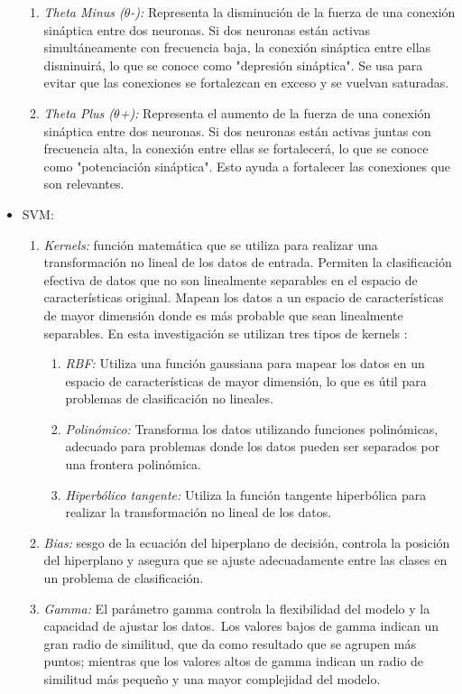 \begin{itemize}
\begin{enumerate}
		\item \textit{Theta Minus ($\theta$-):} Representa la disminución de la fuerza de una conexión sináptica entre dos neuronas. Si dos neuronas están activas simultáneamente con frecuencia baja, la conexión sináptica entre ellas disminuirá, lo que se conoce como "depresión sináptica". Se usa para evitar que las conexiones se fortalezcan en exceso y se vuelvan saturadas.
		\item \textit{Theta Plus ($\theta$+):} Representa el aumento de la fuerza de una conexión sináptica entre dos neuronas. Si dos neuronas están activas juntas con frecuencia alta, la conexión entre ellas se fortalecerá, lo que se conoce como "potenciación sináptica". Esto ayuda a fortalecer las conexiones que son relevantes.
	\end{enumerate}
	\item SVM:
	\begin{enumerate}
		\item \textit{Kernels:} función matemática que se utiliza para realizar una transformación no lineal de los datos de entrada. Permiten la clasificación efectiva de datos que no son linealmente separables en el espacio de características original. Mapean los datos a un espacio de características de mayor dimensión donde es más probable que sean linealmente separables. En esta investigación se utilizan tres tipos de kernels \citep{joachims2002learning}:
		\begin{enumerate}
			\item \textit{RBF:} Utiliza una función gaussiana para mapear los datos en un espacio de características de mayor dimensión, lo que es útil para problemas de clasificación no lineales.
			\item \textit{Polinómico:} Transforma los datos utilizando funciones polinómicas, adecuado para problemas donde los datos pueden ser separados por una frontera polinómica.
			\item \textit{Hiperbólico tangente:} Utiliza la función tangente hiperbólica para realizar la transformación no lineal de los datos.
		\end{enumerate}
		\item \textit{Bias:} sesgo de la ecuación del hiperplano de decisión, controla la posición del hiperplano y asegura que se ajuste adecuadamente entre las clases en un problema de clasificación.
		\item \textit{Gamma:} El parámetro gamma controla la flexibilidad del modelo y la capacidad de ajustar los datos. Los valores bajos de gamma indican un gran radio de similitud, que da como resultado que se agrupen más puntos; mientras que los valores altos de gamma indican un radio de similitud más pequeño y una mayor complejidad del modelo.
	\end{enumerate}
\end{itemize}

